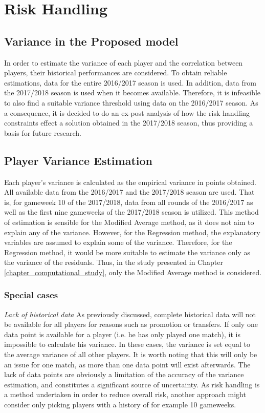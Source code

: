  
\section{Risk Handling} \label{exp_setup_Value_Variance}

\subsection{Variance in the Proposed model}

In order to estimate the variance of each player and the correlation between players, their historical performances are considered. To obtain reliable estimations, data for the entire 2016/2017 season is used. In addition, data from the 2017/2018 season is used when it becomes available. Therefore, it is infeasible to also find a suitable variance threshold using data on the 2016/2017 season. As a consequence, it is decided to do an ex-post analysis of how the risk handling constraints effect a solution obtained in the 2017/2018 season, thus providing a basis for future research.

\subsection{Player Variance Estimation}

Each player's variance is calculated as the empirical variance in points obtained. All available data from the 2016/2017 and the 2017/2018 season are used. That is, for gameweek 10 of the 2017/2018, data from all rounds of the 2016/2017 as well as the first nine gameweeks of the 2017/2018 season is utilized. This method of estimation is sensible for the Modified Average method, as it does not aim to explain any of the variance. However, for the Regression method, the explanatory variables are assumed to explain some of the variance. Therefore, for the Regression method, it would be more suitable to estimate the variance only as the variance of the residuals. Thus, in the study presented in Chapter \ref{chapter_computational_study}, only the Modified Average method is considered. 

\subsubsection{Special cases}

\textit{Lack of historical data}
\newline
As previously discussed, complete historical data will not be available for all players for reasons such as promotion or transfers. If only one data point is available for a player (i.e. he has only played one match), it is impossible to calculate his variance. In these cases, the variance is set equal to the average variance of all other players. It is worth noting that this will only be an issue for one match, as more than one data point will exist afterwards. The lack of data points are obviously a limitation of the accuracy of the variance estimation, and constitutes a significant source of uncertainty. As risk handling is a method undertaken in order to reduce overall risk, another approach might consider only picking players with a history of for example 10 gameweeks. \newpar

